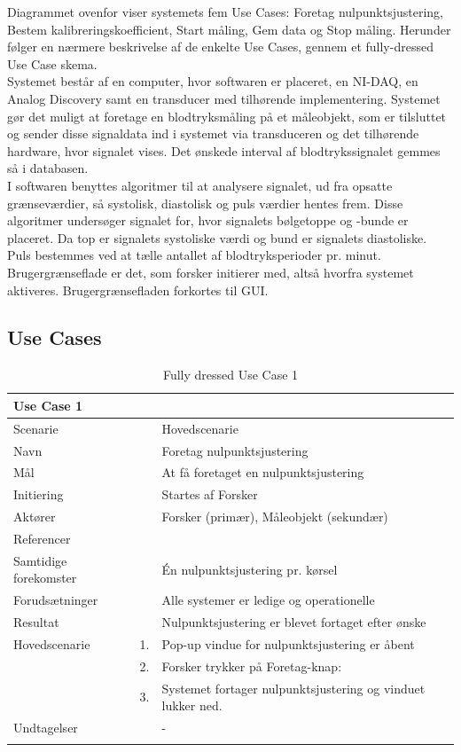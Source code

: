 Diagrammet ovenfor viser systemets fem Use Cases: Foretag nulpunktsjustering, Bestem kalibreringskoefficient, Start måling, Gem data og Stop måling. Herunder følger en nærmere beskrivelse af de enkelte Use Cases, gennem et fully-dressed Use Case skema. \\
\newline
Systemet består af en computer, hvor softwaren er placeret, en NI-DAQ, en Analog Discovery samt en transducer med tilhørende implementering. Systemet gør det muligt at foretage en blodtryksmåling på et måleobjekt, som er tilsluttet og sender disse signaldata ind i systemet via transduceren og det tilhørende hardware, hvor signalet vises. Det ønskede interval af blodtrykssignalet gemmes så i databasen. \\
I softwaren benyttes algoritmer til at analysere signalet, ud fra opsatte grænseværdier, så systolisk, diastolisk og puls værdier hentes frem. Disse algoritmer undersøger signalet for, hvor signalets bølgetoppe og -bunde er placeret. Da top er signalets systoliske værdi og bund er signalets diastoliske. Puls bestemmes ved at tælle antallet af blodtryksperioder pr. minut. \\    
Brugergrænseflade er det, som forsker initierer med, altså hvorfra systemet aktiveres. Brugergrænsefladen forkortes til GUI. 

\subsection{Use Cases}

\begin{longtabu} to  %
	{\large \textbf{Use Case 1}} && \\
	\toprule
	Scenarie 				&&	Hovedscenarie\\
	Navn 					&& 	Foretag nulpunktsjustering\\
	Mål 					&& 	At få foretaget en nulpunktsjustering\\
	Initiering 				&& 	Startes af Forsker\\
	Aktører 				&& 	Forsker (primær), Måleobjekt (sekundær)\\
	Referencer 				&& 	\\
	Samtidige forekomster  	&& 	Én nulpunktsjustering pr. kørsel \\
	Forudsætninger 			&&	Alle systemer er ledige og operationelle\\ 
	Resultat 				&& 	Nulpunktsjustering er blevet fortaget efter ønske\\ \midrule
	Hovedscenarie 			&    1. 	&	Pop-up vindue for nulpunktsjustering er åbent\\				 	
							&    2. 	& 	Forsker trykker på Foretag-knap:\\ 
							& 	 3.		&	 Systemet fortager nulpunktsjustering og vinduet lukker ned.\\[-1ex]
	Undtagelser 			&			& 	-  \\ \bottomrule
	
	\caption{Fully dressed Use Case 1}
	\label{UC1}
\end{longtabu}


